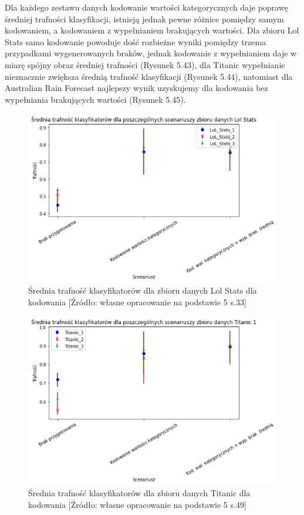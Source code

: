 \documentclass[oneside]{book}
\begin{document}
Dla każdego zestawu danych kodowanie wartości kategorycznych daje poprawę 
średniej trafności klasyfikacji, istnieją jednak pewne 
różnice pomiędzy samym kodowaniem, a kodowaniem z 
wypełnianiem brakujących wartości. Dla zbioru Lol 
Stats samo kodowanie powoduje dość rozbieżne wyniki 
pomiędzy trzema przypadkami wygenerowanych braków, 
jednak kodowanie z wypełnianiem daje w miarę spójny 
obraz średniej trafności (Rysunek 5.43), dla Titanic 
wypełnianie nieznacznie zwiększa średnią trafność 
klasyfikacji (Rysunek 5.44), natomiast dla Australian Rain Forecast
najlepszy wynik uzyskujemy dla 
kodowania bez wypełniania brakujących wartości (Rysunek 5.45).


\begin{figure}[H]
    \centerline{\includegraphics[scale=0.8]{Lol_Stats_Avg_Kodowanie}}
    \centering
    \caption{Średnia trafność klasyfikatorów dla zbioru danych Lol Stats 
    dla kodowania
    [Źródło: własne opracowanie na podstawie 5 s.33]}
    \end{figure}

\begin{figure}[H]
    \centerline{\includegraphics[scale=0.8]{Titanic_Avg_Kodowanie}}
    \centering
    \caption{Średnia trafność klasyfikatorów dla zbioru danych Titanic 
    dla kodowania
    [Źródło: własne opracowanie na podstawie 5 s.49]}
    \end{figure}
\end{document}
